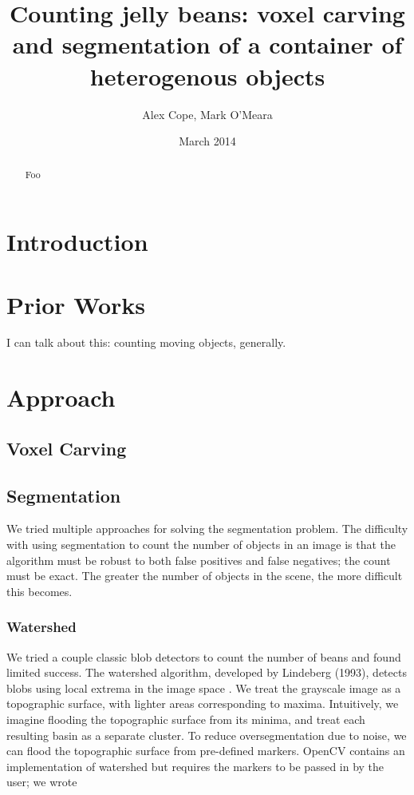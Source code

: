 \documentclass[12pt]{article}
\begin{document}
\title{Counting jelly beans: voxel carving and segmentation of a container of heterogenous objects}
\author{Alex Cope, Mark O'Meara}
\date{March 2014}
\maketitle

\begin{abstract}

Foo

\end{abstract}

\section{Introduction}

\section{Prior Works}

I can talk about this: counting moving objects, generally.

\section{Approach}

\subsection{Voxel Carving}

\subsection{Segmentation}

We tried multiple approaches for solving the segmentation problem. The difficulty with using segmentation to count the number of objects in an image is that the algorithm must be robust to both false positives and false negatives; the count must be exact. The greater the number of objects in the scene, the more difficult this becomes. 

\subsubsection{Watershed}

We tried a couple classic blob detectors to count the number of beans and found limited success. The watershed algorithm, developed by Lindeberg (1993), detects blobs using local extrema in the image space \cite{Wshed}. We treat the grayscale image as a topographic surface, with lighter areas corresponding to maxima. Intuitively, we imagine flooding the topographic surface from its minima, and treat each resulting basin as a separate cluster. To reduce oversegmentation due to noise, we can flood the topographic surface from pre-defined markers. OpenCV contains an implementation of watershed but requires the markers to be passed in by the user; we wrote
\end{document}
